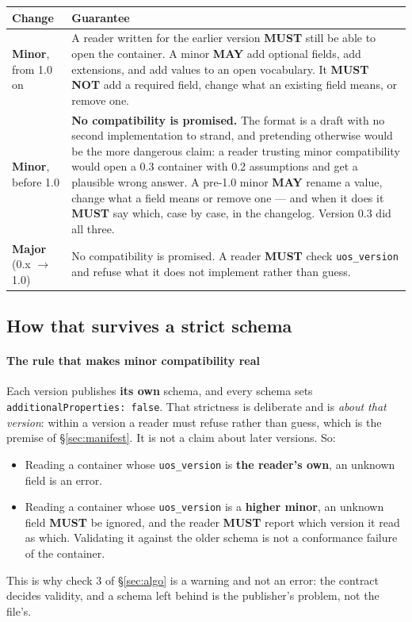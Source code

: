 \documentclass[11pt,a4paper]{article}
\newcommand{\MUST}{\textcolor{uosred}{\textbf{MUST}}}
\newcommand{\MUSTNOT}{\textcolor{uosred}{\textbf{MUST NOT}}}
\newcommand{\MAY}{\textcolor{uosgreen}{\textbf{MAY}}}
\newcommand{\code}[1]{\texttt{\small #1}}
\begin{document}
\begin{longtable}{L{3.0cm} L{12.2cm}}
\toprule
\textbf{Change} & \textbf{Guarantee}\\
\midrule
\endhead
\textbf{Minor}, from 1.0 on & A reader written for the earlier version \MUST{} still be
able to open the container. A minor \MAY{} add optional fields, add extensions, and add
values to an open vocabulary. It \MUSTNOT{} add a required field, change what an existing
field means, or remove one.\\
\textbf{Minor}, before 1.0 & \textbf{No compatibility is promised.} The format is a draft
with no second implementation to strand, and pretending otherwise would be the more
dangerous claim: a reader trusting minor compatibility would open a 0.3 container with 0.2
assumptions and get a plausible wrong answer. A pre-1.0 minor \MAY{} rename a value, change
what a field means or remove one --- and when it does it \MUST{} say which, case by case,
in the changelog. Version 0.3 did all three.\\
\textbf{Major} (0.x $\to$ 1.0) & No compatibility is promised. A reader \MUST{} check
\code{uos\_version} and refuse what it does not implement rather than guess.\\
\bottomrule
\end{longtable}

\subsection{How that survives a strict schema}

\paragraph{The rule that makes minor compatibility real}
Each version publishes \textbf{its own} schema, and every schema sets
\code{additionalProperties: false}. That strictness is deliberate and is \emph{about that
version}: within a version a reader must refuse rather than guess, which is the premise of
\S\ref{sec:manifest}. 
\vspace{6px}
It is not a claim about later versions. So:
\begin{itemize}
  \item Reading a container whose \code{uos\_version} is \textbf{the reader's own}, an
  unknown field is an error.
  \item Reading a container whose \code{uos\_version} is a \textbf{higher minor}, an
  unknown field \MUST{} be ignored, and the reader \MUST{} report which version it read as
  which. Validating it against the older schema is not a conformance failure of the
  container.
\end{itemize}
This is why check 3 of \S\ref{sec:algo} is a warning and not an error: the contract decides
validity, and a schema left behind is the publisher's problem, not the file's.
\end{document}
